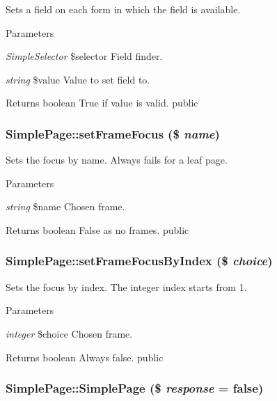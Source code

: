 \label{class_simple_page_a03f791afb1690cd23e646142f3f25739}
Sets a field on each form in which the field is available. 
\begin{DoxyParams}{Parameters}
\item[{\em SimpleSelector}]\$selector Field finder. \item[{\em string}]\$value Value to set field to. \end{DoxyParams}
\begin{DoxyReturn}{Returns}
boolean True if value is valid.  public 
\end{DoxyReturn}
\hypertarget{class_simple_page_ae691ea9abe0789433934e309f77e5139}{
\subsubsection[{setFrameFocus}]{\setlength{\rightskip}{0pt plus 5cm}SimplePage::setFrameFocus (\$ {\em name})}}
\label{class_simple_page_ae691ea9abe0789433934e309f77e5139}
Sets the focus by name. Always fails for a leaf page. 
\begin{DoxyParams}{Parameters}
\item[{\em string}]\$name Chosen frame. \end{DoxyParams}
\begin{DoxyReturn}{Returns}
boolean False as no frames.  public 
\end{DoxyReturn}
\hypertarget{class_simple_page_af37f58382ad7ba3e3278eb067e5dca7b}{
\subsubsection[{setFrameFocusByIndex}]{\setlength{\rightskip}{0pt plus 5cm}SimplePage::setFrameFocusByIndex (\$ {\em choice})}}
\label{class_simple_page_af37f58382ad7ba3e3278eb067e5dca7b}
Sets the focus by index. The integer index starts from 1. 
\begin{DoxyParams}{Parameters}
\item[{\em integer}]\$choice Chosen frame. \end{DoxyParams}
\begin{DoxyReturn}{Returns}
boolean Always false.  public 
\end{DoxyReturn}
\hypertarget{class_simple_page_a0cb05e800a743639a3dcfe6bb7d0f67a}{
\subsubsection[{SimplePage}]{\setlength{\rightskip}{0pt plus 5cm}SimplePage::SimplePage (\$ {\em response} = {\ttfamily false})}}
